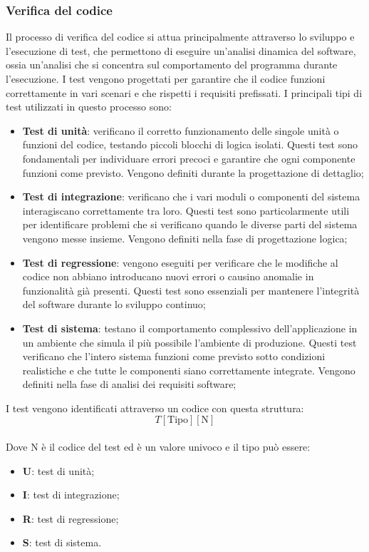 \subsubsection{Verifica del codice}
Il processo di verifica del codice si attua principalmente attraverso lo
sviluppo e l'esecuzione di test, che permettono di eseguire un'analisi dinamica
del software, ossia un'analisi che si concentra sul comportamento del programma
durante l'esecuzione. I test vengono progettati per garantire che il codice
funzioni correttamente in vari scenari e che rispetti i requisiti prefissati. I
principali tipi di test utilizzati in questo processo sono:
\begin{itemize}
      \item \textbf{Test di unità}: verificano il corretto funzionamento delle singole unità o funzioni del codice, testando piccoli blocchi di logica isolati.
            Questi test sono fondamentali per individuare errori precoci e garantire che ogni componente funzioni come previsto.
            Vengono definiti durante la progettazione di dettaglio;
      \item \textbf{Test di integrazione}: verificano che i vari moduli o componenti del sistema interagiscano correttamente tra loro.
            Questi test sono particolarmente utili per identificare problemi che si verificano quando le diverse parti del sistema vengono messe insieme.
            Vengono definiti nella fase di progettazione logica;
      \item \textbf{Test di regressione}: vengono eseguiti per verificare che le modifiche al codice non abbiano introducano nuovi errori o causino anomalie in funzionalità già presenti.
            Questi test sono essenziali per mantenere l'integrità del software durante lo sviluppo continuo;
      \item \textbf{Test di sistema}: testano il comportamento complessivo dell'applicazione in un ambiente che simula il più possibile l'ambiente di produzione.
            Questi test verificano che l'intero sistema funzioni come previsto sotto condizioni realistiche e che tutte le componenti siano correttamente integrate.
            Vengono definiti nella fase di analisi dei requisiti software;
\end{itemize}
I test vengono identificati attraverso un codice con questa struttura:
\textbf{
      \[
            T[\text{Tipo}][ \text{N}]
      \]
}
\\Dove N è il codice del test ed è un valore univoco e il tipo può essere:
\begin{itemize}
      \item \textbf{U}: test di unità;
      \item \textbf{I}: test di integrazione;
      \item \textbf{R}: test di regressione;
      \item \textbf{S}: test di sistema.
\end{itemize}

